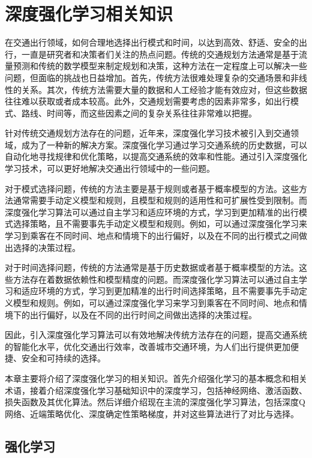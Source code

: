 \chapter{深度强化学习相关知识}
\label{chp:initialization}

在交通出行领域，如何合理地选择出行模式和时间，以达到高效、舒适、安全的出行，一直是研究者和决策者们关注的热点问题。传统的交通规划方法通常是基于流量预测和传统的数学模型来制定规划和决策，这种方法在一定程度上可以解决一些问题，但面临的挑战也日益增加。首先，传统方法很难处理复杂的交通场景和非线性的关系。其次，传统方法需要大量的数据和人工经验才能有效应对，但这些数据往往难以获取或者成本较高。此外，交通规划需要考虑的因素非常多，如出行模式、路线、时间等，而这些因素之间的复杂关系往往非常难以把握。

针对传统交通规划方法存在的问题，近年来，深度强化学习技术被引入到交通领域，成为了一种新的解决方案。深度强化学习通过学习交通系统的历史数据，可以自动化地寻找规律和优化策略，以提高交通系统的效率和性能。通过引入深度强化学习技术，可以更好地解决交通出行领域中的一些问题。

对于模式选择问题，传统的方法主要是基于规则或者基于概率模型的方法。这些方法通常需要手动定义模型和规则，且模型和规则的适用性和可扩展性受到限制。而深度强化学习算法可以通过自主学习和适应环境的方式，学习到更加精准的出行模式选择策略，且不需要事先手动定义模型和规则。例如，可以通过深度强化学习来学习到乘客在不同时间、地点和情境下的出行偏好，以及在不同的出行模式之间做出选择的决策过程。

对于时间选择问题，传统的方法通常是基于历史数据或者基于概率模型的方法。这些方法存在着数据依赖性和模型精度的问题。而深度强化学习算法可以通过自主学习和适应环境的方式，学习到更加精准的出行时间选择策略，且不需要事先手动定义模型和规则。例如，可以通过深度强化学习来学习到乘客在不同时间、地点和情境下的出行偏好，以及在不同的出行时间之间做出选择的决策过程。

因此，引入深度强化学习算法可以有效地解决传统方法存在的问题，提高交通系统的智能化水平，优化交通出行效率，改善城市交通环境，为人们出行提供更加便捷、安全和可持续的选择。

本章主要将介绍了深度强化学习的相关知识。首先介绍强化学习的基本概念和相关术语，接着介绍深度强化学习基础知识中的深度学习，包括神经网络、激活函数、损失函数及其优化算法。然后详细介绍现在主流的深度强化学习算法，包括深度Q网络、近端策略优化、深度确定性策略梯度，并对这些算法进行了对比与选择。
\section{强化学习}
\label{section:2.1}

